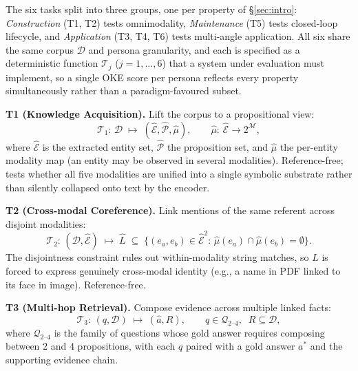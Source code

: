 \documentclass{article}
\begin{document}
The six tasks split into three groups, one per property of \S\ref{sec:intro}: \emph{Construction} (T1, T2) tests omnimodality, \emph{Maintenance} (T5) tests closed-loop lifecycle, and \emph{Application} (T3, T4, T6) tests multi-angle application. All six share the same corpus $\mathcal{D}$ and persona granularity, and each is specified as a deterministic function $\mathcal{T}_j$ ($j\!=\!1,\dots,6$) that a system under evaluation must implement, so a single OKE score per persona reflects every property simultaneously rather than a paradigm-favoured subset.

\noindent\textbf{T1 (Knowledge Acquisition).} Lift the corpus to a propositional view:
\begin{equation}
\mathcal{T}_1\!:\,\mathcal{D}\;\longmapsto\;(\hat{\mathcal{E}},\hat{\mathcal{P}},\hat{\mu}),\qquad \hat{\mu}\!:\,\hat{\mathcal{E}}\!\to\!2^{\mathcal{M}},
\label{eq:t-t1}
\end{equation}
where $\hat{\mathcal{E}}$ is the extracted entity set, $\hat{\mathcal{P}}$ the proposition set, and $\hat{\mu}$ the per-entity modality map (an entity may be observed in several modalities). Reference-free; tests whether all five modalities are unified into a single symbolic substrate rather than silently collapsed onto text by the encoder.

\noindent\textbf{T2 (Cross-modal Coreference).} Link mentions of the same referent across disjoint modalities:
\begin{equation}
\mathcal{T}_2\!:\,(\mathcal{D},\hat{\mathcal{E}})\;\longmapsto\;\hat{L}\;\subseteq\;\bigl\{(e_a,e_b)\!\in\!\hat{\mathcal{E}}^{2}\!:\,\hat{\mu}(e_a)\!\cap\!\hat{\mu}(e_b)\!=\!\emptyset\bigr\}.
\label{eq:t-t2}
\end{equation}
The disjointness constraint rules out within-modality string matches, so $\hat{L}$ is forced to express genuinely cross-modal identity (e.g., a name in PDF linked to its face in image). Reference-free.

\noindent\textbf{T3 (Multi-hop Retrieval).} Compose evidence across multiple linked facts:
\begin{equation}
\mathcal{T}_3\!:\,(q,\mathcal{D})\;\longmapsto\;(\hat{a},R),\qquad q\!\in\!\mathcal{Q}_{2\text{--}4},\;\;R\!\subseteq\!\mathcal{D},
\label{eq:t-t3}
\end{equation}
where $\mathcal{Q}_{2\text{--}4}$ is the family of questions whose gold answer requires composing between $2$ and $4$ propositions, with each $q$ paired with a gold answer $a^{*}$ and the supporting evidence chain.
\end{document}
